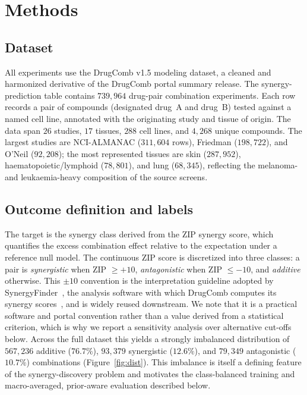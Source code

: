\documentclass{bmcart}
\begin{document}
\section*{Methods}

\subsection*{Dataset}
All experiments use the DrugComb v1.5 modeling dataset, a cleaned and harmonized derivative of the
DrugComb portal summary release. The synergy-prediction table contains $739{,}964$ drug-pair
combination experiments. Each row records a pair of compounds (designated drug~A and drug~B) tested
against a named cell line, annotated with the originating study and tissue of origin. The data span
$26$ studies, $17$ tissues, $288$ cell lines, and $4{,}268$ unique compounds. The largest studies are
NCI-ALMANAC ($311{,}604$ rows), Friedman ($198{,}722$), and O'Neil ($92{,}208$); the most represented
tissues are skin ($287{,}952$), haematopoietic/lymphoid ($78{,}801$), and lung ($68{,}345$),
reflecting the melanoma- and leukaemia-heavy composition of the source screens.

\subsection*{Outcome definition and labels}
The target is the synergy class derived from the ZIP synergy score, which quantifies the excess
combination effect relative to the expectation under a reference null model. The continuous ZIP score is discretized into three classes: a
pair is \emph{synergistic} when ZIP $\geq +10$, \emph{antagonistic} when ZIP $\leq -10$, and
\emph{additive} otherwise. This $\pm 10$ convention is the interpretation guideline adopted by
SynergyFinder~\cite{ianevski2020}, the analysis software with which DrugComb computes its synergy
scores~\cite{zheng2021}, and is widely reused downstream. We note that it is a practical
software and portal convention rather than a value derived from a statistical criterion, which is why
we report a sensitivity analysis over alternative cut-offs below. Across the full dataset this yields a strongly imbalanced distribution of
$567{,}236$ additive ($76.7\%$), $93{,}379$ synergistic ($12.6\%$), and $79{,}349$ antagonistic
($10.7\%$) combinations (Figure~\ref{fig:dist}). This imbalance is itself a defining feature of the
synergy-discovery problem and motivates the class-balanced training and macro-averaged, prior-aware
evaluation described below.
\end{document}
